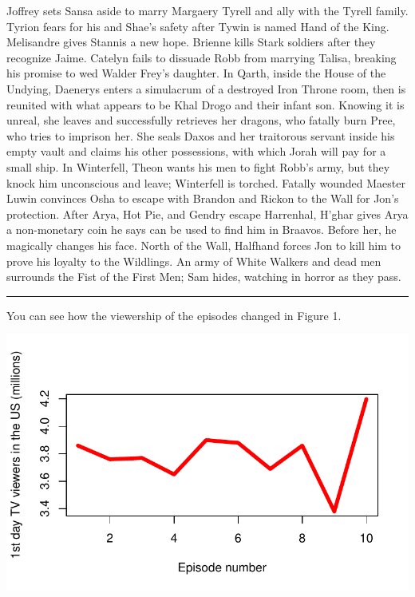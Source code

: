 \documentclass[
  letterpaper,
  DIV=11,
  numbers=noendperiod]{scrartcl}
\begin{document}
Joffrey sets Sansa aside to marry Margaery Tyrell and ally with the
Tyrell family. Tyrion fears for his and Shae's safety after Tywin is
named Hand of the King. Melisandre gives Stannis a new hope. Brienne
kills Stark soldiers after they recognize Jaime. Catelyn fails to
dissuade Robb from marrying Talisa, breaking his promise to wed Walder
Frey's daughter. In Qarth, inside the House of the Undying, Daenerys
enters a simulacrum of a destroyed Iron Throne room, then is reunited
with what appears to be Khal Drogo and their infant son. Knowing it is
unreal, she leaves and successfully retrieves her dragons, who fatally
burn Pree, who tries to imprison her. She seals Daxos and her traitorous
servant inside his empty vault and claims his other possessions, with
which Jorah will pay for a small ship. In Winterfell, Theon wants his
men to fight Robb's army, but they knock him unconscious and leave;
Winterfell is torched. Fatally wounded Maester Luwin convinces Osha to
escape with Brandon and Rickon to the Wall for Jon's protection. After
Arya, Hot Pie, and Gendry escape Harrenhal, H'ghar gives Arya a
non-monetary coin he says can be used to find him in Braavos. Before
her, he magically changes his face. North of the Wall, Halfhand forces
Jon to kill him to prove his loyalty to the Wildlings. An army of White
Walkers and dead men surrounds the Fist of the First Men; Sam hides,
watching in horror as they pass.

\begin{center}\rule{0.5\linewidth}{0.5pt}\end{center}

You can see how the viewership of the episodes changed in Figure 1.

\includegraphics{Assignment_files/figure-pdf/viewers_plot-1.pdf}
\end{document}
